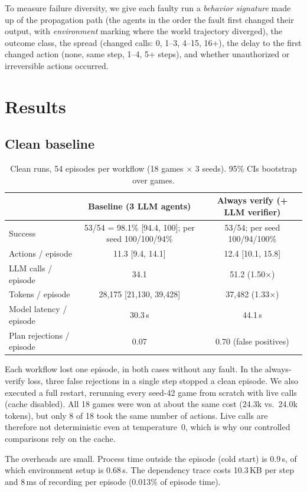 \documentclass[10pt]{article}
\begin{document}
To measure failure diversity, we give each faulty run a \emph{behavior signature} made up of
the propagation path (the agents in the order the fault first changed their output, with
\emph{environment} marking where the world trajectory diverged), the outcome class, the spread
(changed calls: 0, 1--3, 4--15, 16+), the delay to the first changed action (none, same step,
1--4, 5+ steps), and whether unauthorized or irreversible actions occurred.

\section{Results}
\subsection{Clean baseline}
\begin{table}[h]
\centering\small
\caption{Clean runs, 54 episodes per workflow (18 games $\times$ 3 seeds). 95\% CIs
bootstrap over games.}
\label{tab:clean}
\begin{tabular}{@{}lcc@{}}
\toprule
& Baseline (3 LLM agents) & Always verify (+ LLM verifier) \\
\midrule
Success & 53/54 = 98.1\% [94.4, 100]; per seed 100/100/94\% & 53/54; per seed 100/94/100\% \\
Actions / episode & 11.3 [9.4, 14.1] & 12.4 [10.1, 15.8] \\
LLM calls / episode & 34.1 & 51.2 (1.50$\times$) \\
Tokens / episode & 28,175 [21,130, 39,428] & 37,482 (1.33$\times$) \\
Model latency / episode & 30.3\,s & 44.1\,s \\
Plan rejections / episode & 0.07 & 0.70 (false positives) \\
\bottomrule
\end{tabular}
\end{table}

Each workflow lost one episode, in both cases without any fault. In the always-verify loss,
three false rejections in a single step stopped a clean episode. We also executed a full
restart, rerunning every seed-42 game from scratch with live calls (cache disabled). All 18
games were won at about the same cost (24.3k vs.\ 24.0k tokens), but only 8 of 18 took the same
number of actions. Live calls are therefore not deterministic even at temperature~0, which is
why our controlled comparisons rely on the cache.

The overheads are small. Process time outside the episode (cold start) is 0.9\,s, of which
environment setup is 0.68\,s. The dependency trace costs 10.3\,KB per step and 8\,ms of
recording per episode (0.013\% of episode time).
\end{document}
